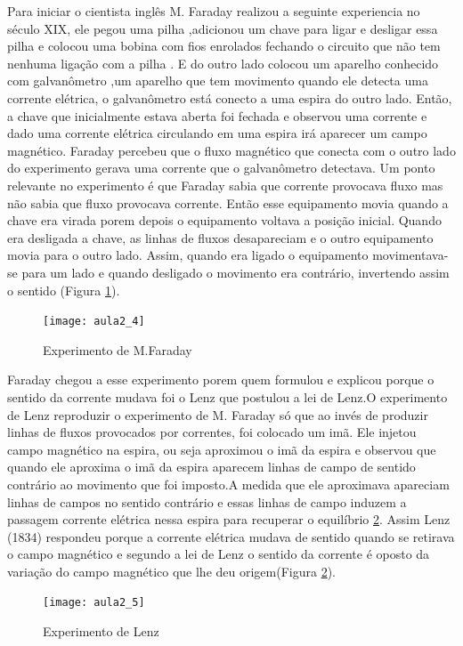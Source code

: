Para iniciar o cientista inglês M. Faraday realizou a seguinte experiencia no século XIX, ele pegou uma pilha ,adicionou um chave para ligar e desligar essa pilha e colocou uma bobina com fios enrolados fechando o circuito que não tem nenhuma ligação com a pilha . E do outro lado colocou um aparelho conhecido com galvanômetro ,um aparelho que tem movimento quando ele detecta uma corrente elétrica, o galvanômetro está conecto a uma espira do outro lado. Então, a chave que inicialmente estava aberta foi fechada e  observou uma corrente e dado uma corrente elétrica circulando em uma espira irá aparecer um campo magnético. Faraday percebeu que o fluxo magnético que conecta com o outro lado do experimento gerava uma corrente que o galvanômetro detectava. Um ponto relevante no experimento é que Faraday sabia que corrente provocava fluxo mas não sabia que fluxo provocava corrente. Então esse equipamento movia quando a chave era virada porem depois o equipamento voltava a posição inicial. Quando era desligada a chave, as linhas de fluxos desapareciam e o outro equipamento movia para o outro lado. Assim, quando era ligado o equipamento movimentava-se para um lado e quando desligado o movimento era contrário, invertendo assim o sentido (Figura \ref{fig:aula2_4}). 
\begin{figure}[H]
\begin{centering}
\texttt{[image: aula2\_4]}\protect\caption{\label{fig:aula2_4}Experimento de M.Faraday }
\end{centering}

\end{figure}
Faraday chegou a esse experimento porem quem formulou e explicou porque
o sentido da corrente mudava foi o Lenz que postulou a lei de Lenz.O
experimento de Lenz reproduzir o experimento de M. Faraday só que
ao invés de produzir linhas de fluxos provocados por correntes, foi
colocado um imã. Ele injetou campo magnético na espira, ou seja aproximou
o imã da espira e observou que quando ele aproxima o imã da espira
aparecem linhas de campo de sentido contrário ao movimento que foi
imposto.A medida que ele aproximava apareciam linhas de campos no
sentido contrário e essas linhas de campo induzem a passagem corrente
elétrica nessa espira para recuperar o equilíbrio \ref{fig:aula2_5}. Assim
Lenz (1834) respondeu porque a corrente elétrica mudava de sentido
quando se retirava o campo magnético e segundo a lei de Lenz o sentido
da corrente é oposto da variação do campo magnético que lhe deu origem(Figura \ref{fig:aula2_5}). 
\begin{figure}[H]
\begin{centering}
\texttt{[image: aula2\_5]}\protect\caption{\label{fig:aula2_5}Experimento de Lenz }
\end{centering}

\end{figure}

